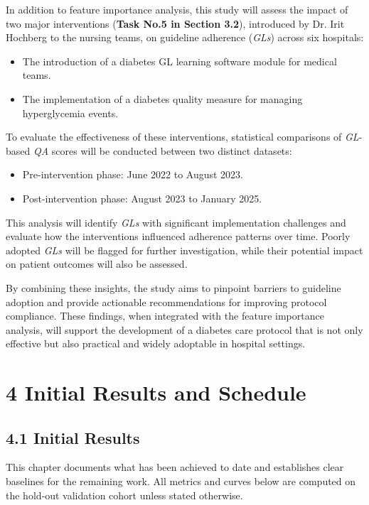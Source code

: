 \documentclass[
]{article}
\begin{document}
In addition to feature importance analysis, this study will assess the
impact of two major interventions (\textbf{Task No.5 in Section 3.2}),
introduced by Dr. Irit Hochberg to the nursing teams, on guideline
adherence (\emph{GLs}) across six hospitals:

\begin{itemize}
\item
  The introduction of a diabetes GL learning software module for medical
  teams.
\item
  The implementation of a diabetes quality measure for managing
  hyperglycemia events.
\end{itemize}

To evaluate the effectiveness of these interventions, statistical
comparisons of \emph{GL}-based \emph{QA} scores will be conducted
between two distinct datasets:

\begin{itemize}
\item
  Pre-intervention phase: June 2022 to August 2023.
\item
  Post-intervention phase: August 2023 to January 2025.
\end{itemize}

This analysis will identify \emph{GLs} with significant implementation
challenges and evaluate how the interventions influenced adherence
patterns over time. Poorly adopted \emph{GLs} will be flagged for
further investigation, while their potential impact on patient outcomes
will also be assessed.

By combining these insights, the study aims to pinpoint barriers to
guideline adoption and provide actionable recommendations for improving
protocol compliance. These findings, when integrated with the feature
importance analysis, will support the development of a diabetes care
protocol that is not only effective but also practical and widely
adoptable in hospital settings.

\section{4 Initial Results and
Schedule}\label{initial-results-and-schedule}

\subsection{4.1 Initial Results}\label{initial-results}

This chapter documents what has been achieved to date and establishes
clear baselines for the remaining work. All metrics and curves below are
computed on the hold‑out validation cohort unless stated otherwise.
\end{document}
